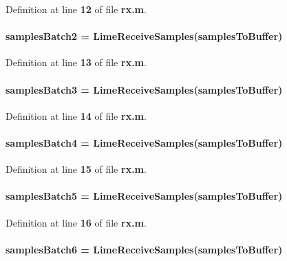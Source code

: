 Definition at line {\bf 12} of file {\bf rx.\+m}.

\paragraph[{samples\+Batch2}]{\setlength{\rightskip}{0pt plus 5cm}samples\+Batch2 = Lime\+Receive\+Samples({\bf samples\+To\+Buffer})}\label{rx_8m_aad186829f40bb0c05784b6aa71885bd8}


Definition at line {\bf 13} of file {\bf rx.\+m}.

\paragraph[{samples\+Batch3}]{\setlength{\rightskip}{0pt plus 5cm}samples\+Batch3 = Lime\+Receive\+Samples({\bf samples\+To\+Buffer})}\label{rx_8m_ab15dc3dbacf82be72d457d6169efecfb}


Definition at line {\bf 14} of file {\bf rx.\+m}.

\paragraph[{samples\+Batch4}]{\setlength{\rightskip}{0pt plus 5cm}samples\+Batch4 = Lime\+Receive\+Samples({\bf samples\+To\+Buffer})}\label{rx_8m_a739544559e0b04d2fc5c7e546b75bb0b}


Definition at line {\bf 15} of file {\bf rx.\+m}.

\paragraph[{samples\+Batch5}]{\setlength{\rightskip}{0pt plus 5cm}samples\+Batch5 = Lime\+Receive\+Samples({\bf samples\+To\+Buffer})}\label{rx_8m_a08944b7c94c99a5de15497b1ff0e3b26}


Definition at line {\bf 16} of file {\bf rx.\+m}.

\paragraph[{samples\+Batch6}]{\setlength{\rightskip}{0pt plus 5cm}samples\+Batch6 = Lime\+Receive\+Samples({\bf samples\+To\+Buffer})}\label{rx_8m_af80c4982bb3e21f53e23aec35cf62d32}



